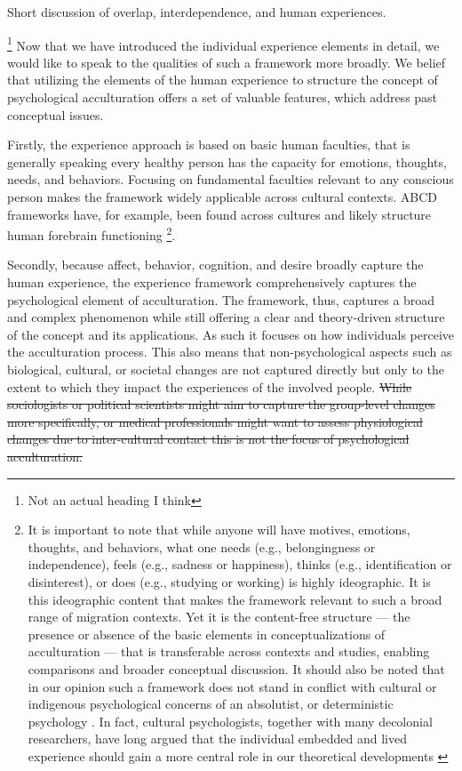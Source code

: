 \documentclass[nobib]{tufte-handout}
\begin{document}
\hl{}
Short discussion of overlap, interdependence, and human experiences.

\footnote{Not an actual heading I think} 
Now that we have introduced the individual experience elements in detail, we would like to speak to the qualities of such a framework more broadly. We belief that utilizing the elements of the human experience to structure the concept of psychological acculturation offers a set of valuable features, which address past conceptual issues. 

Firstly, the experience approach is based on basic human faculties, that is generally speaking every healthy person has the capacity for emotions, thoughts, needs, and behaviors. Focusing on fundamental faculties relevant to any conscious person makes the framework widely applicable across cultural contexts. ABCD frameworks have, for example, been found across cultures \citep[e.g.,][]{Bhawuk2011} and likely structure human forebrain functioning \citep{Swanson2020}\footnote{It is important to note that while anyone will have motives, emotions, thoughts, and behaviors, what one needs (e.g., belongingness or independence), feels (e.g., sadness or happiness), thinks (e.g., identification or disinterest), or does (e.g., studying or working) is highly ideographic. It is this ideographic content that makes the framework relevant to such a broad range of migration contexts. Yet it is the content-free structure --- the presence or absence of the basic elements in conceptualizations of acculturation --- that is transferable across contexts and studies, enabling comparisons and broader conceptual discussion. It should also be noted that in our opinion such a framework does not stand in conflict with cultural or indigenous psychological concerns of an absolutist, or deterministic psychology \citep[e.g.,][]{Kim2006a}. In fact, cultural psychologists, together with many decolonial researchers, have long argued that the individual embedded and lived experience should gain a more central role in our theoretical developments \citep[e.g., ontological turn;][]{Pedersen2020}}.

Secondly, because affect, behavior, cognition, and desire broadly capture the human experience, the experience framework comprehensively captures the psychological element of acculturation. The framework, thus, captures a broad and complex phenomenon while still offering a clear and theory-driven structure of the concept and its applications. 
As such it focuses on how individuals perceive the acculturation process. This also means that non-psychological aspects such as biological, cultural, or societal changes are not captured directly but only to the extent to which they impact the experiences of the involved people. \sout{While sociologists or political scientists might aim to capture the group-level changes more specifically, or medical professionals might want to assess physiological changes due to inter-cultural contact this is not the focus of psychological acculturation.} 
\end{document}
